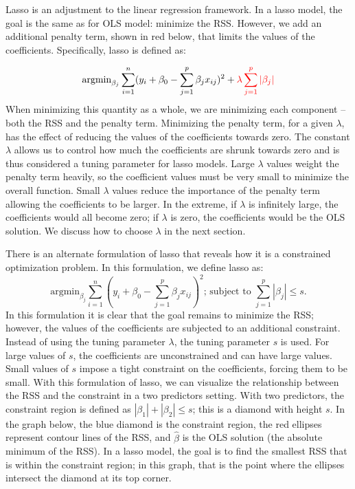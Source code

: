 \documentclass[
]{article}
\begin{document}
Lasso is an adjustment to the linear regression framework. In a lasso
model, the goal is the same as for OLS model: minimize the RSS. However,
we add an additional penalty term, shown in red below, that limits the
values of the coefficients. Specifically, lasso is defined as:

\[\text{argmin}_{\beta_j}\sum_{i=1}^n ( y_i +\beta_0 - \sum_{j=1}^p \beta_jx_{ij} )^2 + \color{red}{\lambda \sum_{j=1}^p |\beta_j|}\]
When minimizing this quantity as a whole, we are minimizing each
component -- both the RSS and the penalty term. Minimizing the penalty
term, for a given \(\lambda\), has the effect of reducing the values of
the coefficients towards zero. The constant \(\lambda\) allows us to
control how much the coefficients are shrunk towards zero and is thus
considered a tuning parameter for lasso models. Large \(\lambda\) values
weight the penalty term heavily, so the coefficient values must be very
small to minimize the overall function. Small \(\lambda\) values reduce
the importance of the penalty term allowing the coefficients to be
larger. In the extreme, if \(\lambda\) is infinitely large, the
coefficients would all become zero; if \(\lambda\) is zero, the
coefficients would be the OLS solution. We discuss how to choose
\(\lambda\) in the next section.

There is an alternate formulation of lasso that reveals how it is a
constrained optimization problem. In this formulation, we define lasso
as: \[
\text{argmin}_{\beta_j}\sum_{i=1}^n ( y_i +\beta_0 - \sum_{j=1}^p \beta_jx_{ij} )^2  \text{; subject to }  \sum_{j=1}^p |\beta_j| \le s.
\] In this formulation it is clear that the goal remains to minimize the
RSS; however, the values of the coefficients are subjected to an
additional constraint. Instead of using the tuning parameter
\(\lambda\), the tuning parameter \(s\) is used. For large values of
\(s\), the coefficients are unconstrained and can have large values.
Small values of \(s\) impose a tight constraint on the coefficients,
forcing them to be small. With this formulation of lasso, we can
visualize the relationship between the RSS and the constraint in a two
predictors setting. With two predictors, the constraint region is
defined as \(|\beta_1| + |\beta_2| \le s\); this is a diamond with
height \(s\). In the graph below, the blue diamond is the constraint
region, the red ellipses represent contour lines of the RSS, and
\(\hat{\beta}\) is the OLS solution (the absolute minimum of the RSS).
In a lasso model, the goal is to find the smallest RSS that is within
the constraint region; in this graph, that is the point where the
ellipses intersect the diamond at its top corner.
\end{document}
